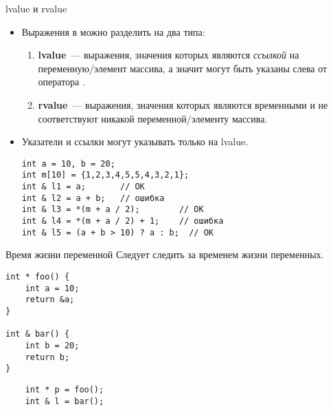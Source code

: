 \documentclass{beamer}
\begin{document}
\begin{frame}[fragile]{lvalue и rvalue}
    \begin{itemize}
        \item Выражения в \langcpp можно разделить на два типа:
            \begin{enumerate}
                \item {\bf lvalue}~--- выражения, значения которых являются
                    {\em ссылкой} на переменную/элемент массива, 
                    а значит могут быть указаны слева от оператора \code{=}.
                    
                \item {\bf rvalue}~--- выражения, значения которых являются
                    временными и не соответствуют никакой переменной/элементу
                    массива.
            \end{enumerate}

        \item Указатели и ссылки могут указывать только на lvalue.
\begin{lstlisting}
int a = 10, b = 20;
int m[10] = {1,2,3,4,5,5,4,3,2,1};
int & l1 = a;       // OK
int & l2 = a + b;   // ошибка
int & l3 = *(m + a / 2);        // OK
int & l4 = *(m + a / 2) + 1;    // ошибка
int & l5 = (a + b > 10) ? a : b;  // OK
\end{lstlisting}
\end{itemize}
\end{frame}

\begin{frame}[fragile]{Время жизни переменной}
    Следует следить за временем жизни переменных.
\begin{lstlisting}
int * foo() {
    int a = 10;
    return &a;
}

int & bar() {
    int b = 20;
    return b;
}
\end{lstlisting}
\begin{lstlisting}
    int * p = foo();
    int & l = bar();
\end{lstlisting}

\end{frame}
\end{document}
